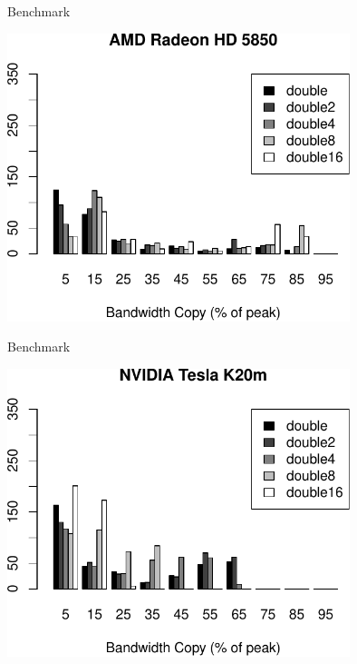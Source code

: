 \begin{frame}{Benchmark}
  \begin{center} \includegraphics[width=0.75\textwidth]{figures/hd5850_double_hist_vec_dot} \end{center}
\end{frame}

\begin{frame}{Benchmark}
  \begin{center} \includegraphics[width=0.75\textwidth]{figures/k20m_double_hist_vec_dot} \end{center}
\end{frame}



